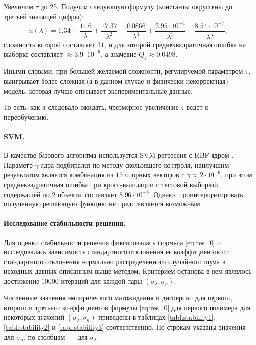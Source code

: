 \documentclass[12pt,a4paper]{article}
\theoremstyle{definition}
\begin{document}
Увеличим $\tau$ до 25. Получим следующую формулу (константы округлены до третьей значащей цифры):
\begin{equation}
  n(\lambda) = 1.34 + \frac{11.6}{\lambda} + \frac{17.37}{\lambda^2} + \frac{0.0866}{\lambda^3} + \frac{2.95 \cdot 10^{-4}}{\lambda^4} + \frac{8.54 \cdot 10^{-7}}{\lambda^5},
  \label{eq:res_incorrect}
\end{equation}
сложность которой составляет $31$, и для которой среднеквадратичная ошибка
на выборке составляет $\approx 3.9 \cdot 10^{-9}$,
а значение $Q_f \approx 0.0498$.

Иными словами, при большей желаемой сложности,
регулируемой параметром $\tau$, выигрывает более сложная (а в данном случае и
физически некорректная) модель, которая лучше описывает экспериментальные данные.

То есть, как и следовало ожидать, чрезмерное увеличение $\tau$ ведет к переобучению.

\paragraph{SVM.}

В качестве базового алгоритма используется SVM-регрессия с RBF-ядром \cite{Vapnik79}.
Параметр $\gamma$ ядра подбирался по методу скользящего контроля, наилучшим результатом является
комбинация из $15$ опорных векторов c $\gamma \approx 2 \cdot 10^{-6}$, при этом
среднеквадратичная ошибка при кросс-валидации с тестовой выборкой, содержащей по 2
объекта, составляет $8.96 \cdot 10^{-8}$. Однако, проинтерпретировать полученную
решающую функцию не представляется возможным.

\paragraph{Исследование стабильности решения.}

Для оценки стабильности решения фиксировалась формула \eqref{eq:res_0} и исследовалась
зависимость стандартного отклонения ее коэффициентов от стандартного отклонения
нормально распределенного случайного шума в исходных данных описанным выше методом.
Критерием останова в нем являлось достижение 10000 итераций для каждой пары
$(\sigma_{\lambda}, \sigma_n)$.

Численные значения эмпирического матожидания и дисперсии для первого, второго и третьего
коэффициентов формулы \eqref{eq:res_0} для первого полимера для некоторых значений
$(\sigma_{\lambda}, \sigma_n)$ приведены в таблицах \ref{tabl:stability1},
\ref{tabl:stability2} и \ref{tabl:stability3} соответственно. По строкам указаны значения
для $\sigma_n$, по столбцам~--- для $\sigma_{\lambda}$.
\end{document}
